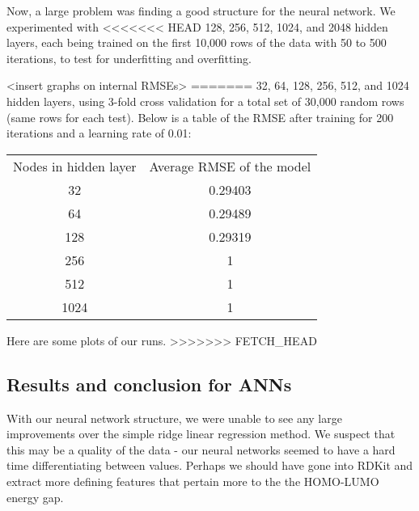 \documentclass{article}
\begin{document}
Now, a large problem was finding a good structure for the neural network. 
 We experimented with 
<<<<<<< HEAD
128, 256, 512, 1024, and 2048 hidden layers, each being trained on the first
 10,000 rows of the data with 50 to 500 iterations, to test for underfitting and
  overfitting.

<insert graphs on internal RMSEs>
=======
32, 64, 128, 256, 512, and 1024 hidden layers, using 3-fold cross
validation for a total set of 30,000 random rows (same rows for each test).
Below is a table of the RMSE after training for 200 iterations and
a learning rate of 0.01:

\begin{tabular}{ c | c }
  Nodes in hidden layer & Average RMSE of the model  \\
  32 & 0.29403  \\
  64 & 0.29489  \\
  128 & 0.29319 \\
  256 & 1 \\
  512 & 1 \\
  1024 & 1 \\
\end{tabular}

Here are some plots of our runs.
>>>>>>> FETCH_HEAD

\subsection{Results and conclusion for ANNs}
With our neural network structure, we were unable to see any large 
improvements over the simple ridge linear regression method.  We suspect
 that this may be a quality of the data - our neural networks seemed to 
 have a hard time differentiating between values.  Perhaps we should have gone
  into RDKit and extract more defining features that pertain more to the the 
  HOMO-LUMO energy gap.  
\end{document}
